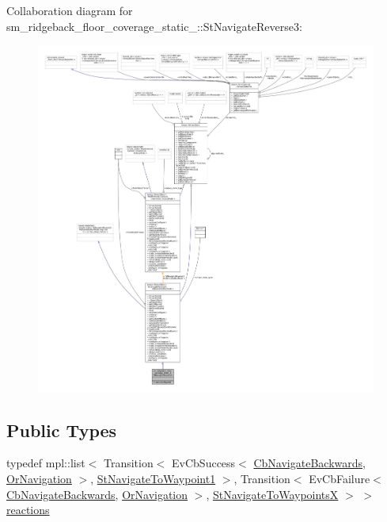 Collaboration diagram for sm\+\_\+ridgeback\+\_\+floor\+\_\+coverage\+\_\+static\+\_\+:\+:St\+Navigate\+Reverse3\+:
\nopagebreak
\begin{figure}[H]
\begin{center}
\leavevmode
\includegraphics[width=350pt]{structsm__ridgeback__floor__coverage__static__1_1_1StNavigateReverse3__coll__graph}
\end{center}
\end{figure}
\subsection*{Public Types}
\begin{DoxyCompactItemize}
\item 
typedef mpl\+::list$<$ Transition$<$ Ev\+Cb\+Success$<$ \hyperlink{classcl__move__base__z_1_1CbNavigateBackwards}{Cb\+Navigate\+Backwards}, \hyperlink{classsm__ridgeback__floor__coverage__static__1_1_1OrNavigation}{Or\+Navigation} $>$, \hyperlink{structsm__ridgeback__floor__coverage__static__1_1_1StNavigateToWaypoint1}{St\+Navigate\+To\+Waypoint1} $>$, Transition$<$ Ev\+Cb\+Failure$<$ \hyperlink{classcl__move__base__z_1_1CbNavigateBackwards}{Cb\+Navigate\+Backwards}, \hyperlink{classsm__ridgeback__floor__coverage__static__1_1_1OrNavigation}{Or\+Navigation} $>$, \hyperlink{structsm__ridgeback__floor__coverage__static__1_1_1StNavigateToWaypointsX}{St\+Navigate\+To\+WaypointsX} $>$ $>$ \hyperlink{structsm__ridgeback__floor__coverage__static__1_1_1StNavigateReverse3_a9d1dd27b2769894b2aa7bff447b99b0a}{reactions}
\end{DoxyCompactItemize}

